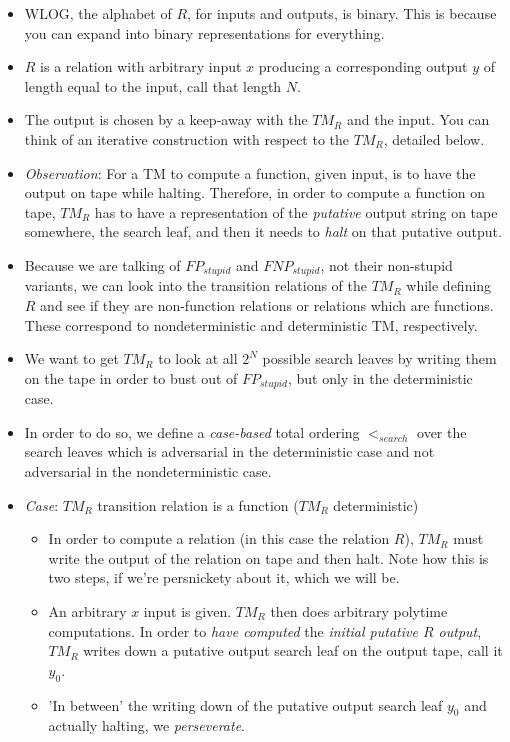 \documentclass{article}
\begin{document}
\begin{itemize}
    \item WLOG, the alphabet of $R$, for inputs and outputs, is binary. This is because you can expand into binary representations for everything.
    \item $R$ is a relation with arbitrary input $x$ producing a corresponding output $y$ of length equal to the input, call that length $N$.
    \item The output is chosen by a keep-away with the $TM_R$ and the input. You can think of an iterative construction with respect to the $TM_R$, detailed below.
    \item \textit{Observation}: For a TM to compute a function, given input, is to have the output on tape while halting. Therefore, in order to compute a function on tape, $TM_R$ has to have a representation of the \textit{putative} output string on tape somewhere, the search leaf, and then it needs to \textit{halt} on that putative output.
    \item Because we are talking of $FP_{stupid}$ and $FNP_{stupid}$, not their non-stupid variants, we can look into the transition relations of the $TM_R$ while defining $R$ and see if they are non-function relations or relations which are functions. These correspond to nondeterministic and deterministic TM, respectively.
    \item We want to get $TM_R$ to look at all $2^N$ possible search leaves by writing them on the tape in order to bust out of $FP_{stupid}$, but only in the deterministic case.
    \item In order to do so, we define a \textit{case-based} total ordering $<_{search}$ over the search leaves which is adversarial in the deterministic case and not adversarial in the nondeterministic case.
    \item \textit{Case}: $TM_R$ transition relation is a function ($TM_R$ deterministic)
    \begin{itemize}
        \item In order to compute a relation (in this case the relation $R$), $TM_R$ must write the output of the relation on tape and then halt. Note how this is two steps, if we're persnickety about it, which we will be.
        \item An arbitrary $x$ input is given. $TM_R$ then does arbitrary polytime computations. In order to \textit{have computed} the \textit{initial putative $R$ output}, $TM_R$ writes down a putative output search leaf on the output tape, call it $y_0$.
        \item 'In between' the writing down of the putative output search leaf $y_0$ and actually halting, we \textit{perseverate}.

\end{itemize}
\end{itemize}
\end{document}
